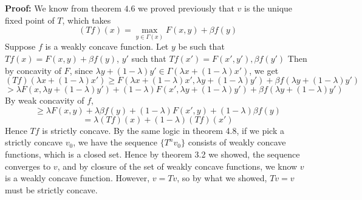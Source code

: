 \documentclass[10pt,letter]{article}
\begin{document}
\textbf{Proof:} We know from theorem $4.6$ we proved previously that $v$ is the unique fixed point of $T$, which takes
\[(Tf)(x) = \max_{y \in \Gamma(x)} F(x,y) + \beta f(y) \]
Suppose $f$ is a weakly concave function. Let $y$ be such that $Tf(x) = F(x,y) + \beta f(y)$, $y'$ such that $Tf(x') = F(x',y'), \beta f(y')$
Then by concavity of $F$, since $\lambda y + (1-\lambda)y' \in \Gamma(\lambda x + (1-\lambda)x')$, we get
\[(Tf)(\lambda x + (1-\lambda) x') \ge F(\lambda x + (1-\lambda) x',\lambda y + (1-\lambda)y') + \beta f(\lambda y + (1-\lambda)y') \]
\[ > \lambda F(x,\lambda y + (1-\lambda)y') + (1-\lambda) F(x',\lambda y + (1-\lambda)y') + \beta f(\lambda y + (1-\lambda)y') \]
By weak concavity of $f$,
\[ \ge  \lambda F(x,y) + \lambda \beta f(y) + (1-\lambda) F(x',y) + (1-\lambda)\beta f(y) \]
\[ = \lambda(Tf)(x) + (1-\lambda)(Tf)(x') \]
Hence $Tf$ is strictly concave. By the same logic in theorem 4.8, if we pick a strictly concave $v_0$, we have the sequence $\{ T^n v_0 \}$ consists of weakly concave functions, which is a closed set. Hence by theorem 3.2 we showed, the sequence converges to $v$, and by closure of the set of weakly concave functions, we know $v$ is a weakly concave function. However, $v = Tv$, so by what we showed, $Tv = v$ must be strictly concave.
\end{document}
